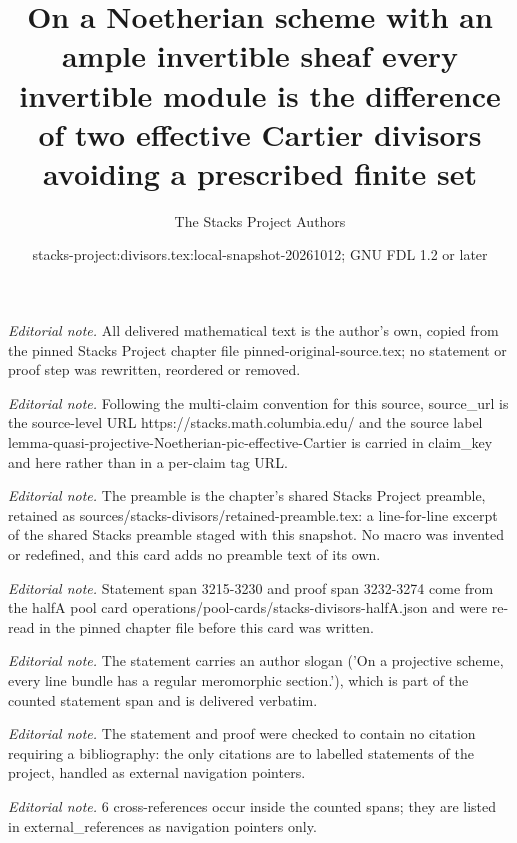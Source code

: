 \documentclass[10pt,a4paper]{amsart}
\title{On a Noetherian scheme with an ample invertible sheaf every invertible module is the difference of two effective Cartier divisors avoiding a prescribed finite set}
\author{The Stacks Project Authors}
\date{stacks-project:divisors.tex:local-snapshot-20261012; GNU FDL 1.2 or later}
\theoremstyle{plain}
\theoremstyle{definition}
\theoremstyle{remark}
\numberwithin{equation}{subsection}
\begin{document}
\maketitle
\noindent\textit{Editorial note.} All delivered mathematical text is the author's own, copied from the pinned Stacks Project chapter file pinned-original-source.tex; no statement or proof step was rewritten, reordered or removed.\par\medskip
\noindent\textit{Editorial note.} Following the multi-claim convention for this source, source\_url is the source-level URL https://stacks.math.columbia.edu/ and the source label lemma-quasi-projective-Noetherian-pic-effective-Cartier is carried in claim\_key and here rather than in a per-claim tag URL.\par\medskip
\noindent\textit{Editorial note.} The preamble is the chapter's shared Stacks Project preamble, retained as sources/stacks-divisors/retained-preamble.tex: a line-for-line excerpt of the shared Stacks preamble staged with this snapshot. No macro was invented or redefined, and this card adds no preamble text of its own.\par\medskip
\noindent\textit{Editorial note.} Statement span 3215-3230 and proof span 3232-3274 come from the halfA pool card operations/pool-cards/stacks-divisors-halfA.json and were re-read in the pinned chapter file before this card was written.\par\medskip
\noindent\textit{Editorial note.} The statement carries an author slogan ('On a projective scheme, every line bundle has a regular meromorphic section.'), which is part of the counted statement span and is delivered verbatim.\par\medskip
\noindent\textit{Editorial note.} The statement and proof were checked to contain no citation requiring a bibliography: the only citations are to labelled statements of the project, handled as external navigation pointers.\par\medskip
\noindent\textit{Editorial note.} 6 cross-references occur inside the counted spans; they are listed in external\_references as navigation pointers only.\par\medskip
\end{document}
